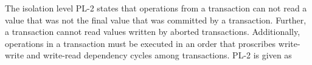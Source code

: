 \documentclass{sig-alternate-05-2015}
\begin{document}
The isolation level PL-2 states that operations from a transaction can not read a value that was not the final value that was
committed by a transaction. Further, a transaction cannot read values written by aborted transactions. Additionally,
operations in a transaction must be executed in an order
that proscribes write-write and write-read dependency cycles \cite{DBLP:conf/icde/AdyaLO00} among transactions. PL-2 is given as
\end{document}
